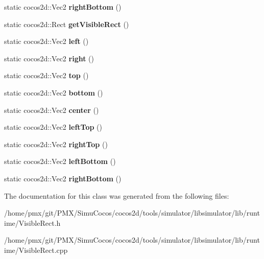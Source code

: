 \begin{DoxyCompactItemize}
\item 
\mbox{\label{classVisibleRect_ac816394261e225a910a93ccbeebd071c}} 
static cocos2d\+::\+Vec2 {\bfseries right\+Bottom} ()
\item 
\mbox{\label{classVisibleRect_aa6bbe64fb8c6a2ab1b12800a8f144583}} 
static cocos2d\+::\+Rect {\bfseries get\+Visible\+Rect} ()
\item 
\mbox{\label{classVisibleRect_ae2325bbeb4b8db2c18f54fe953792ce0}} 
static cocos2d\+::\+Vec2 {\bfseries left} ()
\item 
\mbox{\label{classVisibleRect_afad8f1e159a058096a7ac955f63c0e08}} 
static cocos2d\+::\+Vec2 {\bfseries right} ()
\item 
\mbox{\label{classVisibleRect_aa1caa244b76b83569954421814031b44}} 
static cocos2d\+::\+Vec2 {\bfseries top} ()
\item 
\mbox{\label{classVisibleRect_a0ef61f6b277465388709d5e12180c534}} 
static cocos2d\+::\+Vec2 {\bfseries bottom} ()
\item 
\mbox{\label{classVisibleRect_a924b68ccdbe5f2853801f8039777e8fb}} 
static cocos2d\+::\+Vec2 {\bfseries center} ()
\item 
\mbox{\label{classVisibleRect_a6c908113d50cb59f66aadca508717e99}} 
static cocos2d\+::\+Vec2 {\bfseries left\+Top} ()
\item 
\mbox{\label{classVisibleRect_a501154a0f5511c3b64e2496bea1ad6fa}} 
static cocos2d\+::\+Vec2 {\bfseries right\+Top} ()
\item 
\mbox{\label{classVisibleRect_a11694cd5b211a678cc9c76faf0a6ec0f}} 
static cocos2d\+::\+Vec2 {\bfseries left\+Bottom} ()
\item 
\mbox{\label{classVisibleRect_a076c2917023f0ca8c48b0eb53708b8a0}} 
static cocos2d\+::\+Vec2 {\bfseries right\+Bottom} ()
\end{DoxyCompactItemize}


The documentation for this class was generated from the following files\+:\begin{DoxyCompactItemize}
\item 
/home/pmx/git/\+P\+M\+X/\+Simu\+Cocos/cocos2d/tools/simulator/libsimulator/lib/runtime/Visible\+Rect.\+h\item 
/home/pmx/git/\+P\+M\+X/\+Simu\+Cocos/cocos2d/tools/simulator/libsimulator/lib/runtime/Visible\+Rect.\+cpp\end{DoxyCompactItemize}
